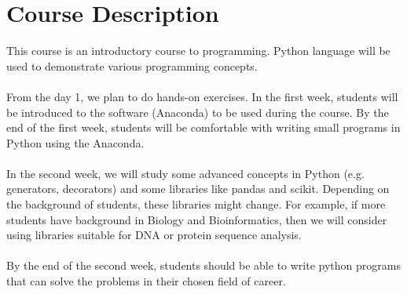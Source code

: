 \section{Course Description}
This course is an introductory course to programming.
Python language will be used to demonstrate various programming concepts.
\paragraph{}
From the day 1, we plan to do hands-on exercises. In the first week,
students will be introduced to the software (Anaconda) to be used during the course.
By the end of the first week, students will be comfortable with writing small
programs in Python using the Anaconda.
\paragraph{}
In the second week, we will study some advanced concepts in Python (e.g. generators, decorators)
and some libraries like pandas and scikit. Depending on the background of students, these
libraries might change. For example, if more students have background in Biology and Bioinformatics,
then we will consider using libraries suitable for DNA or protein sequence analysis.
\paragraph{}
By the end of the second week, students should be able to write python programs that
can solve the problems in their chosen field of career.
